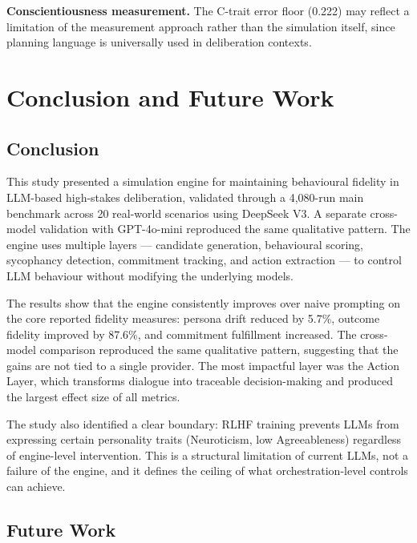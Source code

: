 \documentclass[12pt, a4paper]{report}
\begin{document}
\textbf{Conscientiousness measurement.} The C-trait error floor (0.222) may reflect a limitation of the measurement approach rather than the simulation itself, since planning language is universally used in deliberation contexts.


\chapter{Conclusion and Future Work}

\section{Conclusion}

This study presented a simulation engine for maintaining behavioural fidelity in LLM-based high-stakes deliberation, validated through a 4,080-run main benchmark across 20 real-world scenarios using DeepSeek V3. A separate cross-model validation with GPT-4o-mini reproduced the same qualitative pattern. The engine uses multiple layers --- candidate generation, behavioural scoring, sycophancy detection, commitment tracking, and action extraction --- to control LLM behaviour without modifying the underlying models.

The results show that the engine consistently improves over naive prompting on the core reported fidelity measures: persona drift reduced by 5.7\%, outcome fidelity improved by 87.6\%, and commitment fulfillment increased. The cross-model comparison reproduced the same qualitative pattern, suggesting that the gains are not tied to a single provider. The most impactful layer was the Action Layer, which transforms dialogue into traceable decision-making and produced the largest effect size of all metrics.

The study also identified a clear boundary: RLHF training prevents LLMs from expressing certain personality traits (Neuroticism, low Agreeableness) regardless of engine-level intervention. This is a structural limitation of current LLMs, not a failure of the engine, and it defines the ceiling of what orchestration-level controls can achieve.


\section{Future Work}
\end{document}

